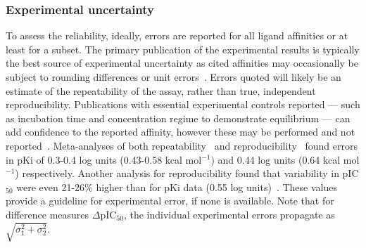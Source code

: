 \documentclass[9pt,bestpractices]{livecoms}
\begin{document}
\subsubsection{Experimental uncertainty}
To assess the reliability, ideally, errors are reported for all ligand affinities or at least for a subset. The primary publication of the experimental results is typically the best source of experimental uncertainty as cited affinities may occasionally be subject to rounding differences or unit errors~\cite{kramer2012experimental}. Errors quoted will likely be an estimate of the repeatability of the assay, rather than true, independent reproducibility. Publications with essential experimental controls reported --- such as incubation time and concentration regime to demonstrate equilibrium --- can add confidence to the reported affinity, however these may be performed and not reported~\cite{jarmoskaite2020measure}. Meta-analyses of both repeatability~\cite{sheridan2020experimental} and reproducibility~\cite{kramer2012experimental} found errors in pKi of 0.3-0.4 log units (0.43-0.58 kcal mol$^{-1}$) and 0.44 log units (0.64 kcal mol$^{-1}$) respectively.  Another analysis for reproducibility found that variability in pIC$_{50}$ were even 21-26\% higher than for pKi data (0.55 log units)~\cite{kalliokoski_comparability_2013}. These values provide a guideline for experimental error, if none is available. Note that for difference measures $\Delta $pIC$_{50}$, the individual experimental errors propagate as $\sqrt{\sigma_1^2+\sigma_2^2}$.
\end{document}

